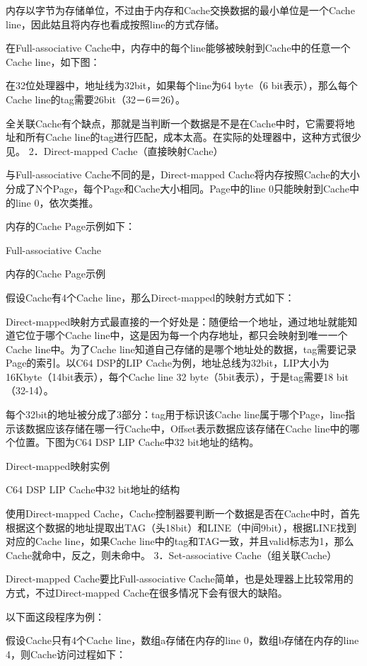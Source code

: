 \documentclass[12pt,UTF8]{ctexbook}
\begin{document}
内存以字节为存储单位，不过由于内存和Cache交换数据的最小单位是一个Cache line，因此姑且将内存也看成按照line的方式存储。

在Full-associative Cache中，内存中的每个line能够被映射到Cache中的任意一个Cache line，如下图：

在32位处理器中，地址线为32bit，如果每个line为64 byte（6 bit表示），那么每个Cache line的tag需要26bit（32－6＝26）。

全关联Cache有个缺点，那就是当判断一个数据是不是在Cache中时，它需要将地址和所有Cache line的tag进行匹配，成本太高。在实际的处理器中，这种方式很少见。
2．Direct-mapped Cache（直接映射Cache）

与Full-associative Cache不同的是，Direct-mapped Cache将内存按照Cache的大小分成了N个Page，每个Page和Cache大小相同。Page中的line 0只能映射到Cache中的line 0，依次类推。

内存的Cache Page示例如下：

Full-associative Cache

内存的Cache Page示例

假设Cache有4个Cache line，那么Direct-mapped的映射方式如下：

Direct-mapped映射方式最直接的一个好处是：随便给一个地址，通过地址就能知道它位于哪个Cache line中，这是因为每一个内存地址，都只会映射到唯一一个Cache line中。为了Cache line知道自己存储的是哪个地址处的数据，tag需要记录Page的索引。以C64 DSP的LIP Cache为例，地址总线为32bit，LIP大小为16Kbyte（14bit表示），每个Cache line 32 byte（5bit表示），于是tag需要18 bit（32-14）。

每个32bit的地址被分成了3部分：tag用于标识该Cache line属于哪个Page，line指示该数据应该存储在哪一行Cache中，Offset表示数据应该存储在Cache line中的哪个位置。下图为C64 DSP LIP Cache中32 bit地址的结构。

Direct-mapped映射实例

C64 DSP LIP Cache中32 bit地址的结构

使用Direct-mapped Cache，Cache控制器要判断一个数据是否在Cache中时，首先根据这个数据的地址提取出TAG（头18bit）和LINE（中间9bit），根据LINE找到对应的Cache line，如果Cache line中的tag和TAG一致，并且valid标志为1，那么Cache就命中，反之，则未命中。
3．Set-associative Cache（组关联Cache）

Direct-mapped Cache要比Full-associative Cache简单，也是处理器上比较常用的方式，不过Direct-mapped Cache在很多情况下会有很大的缺陷。

以下面这段程序为例：

假设Cache只有4个Cache line，数组a存储在内存的line 0，数组b存储在内存的line 4，则Cache访问过程如下：
\end{document}
